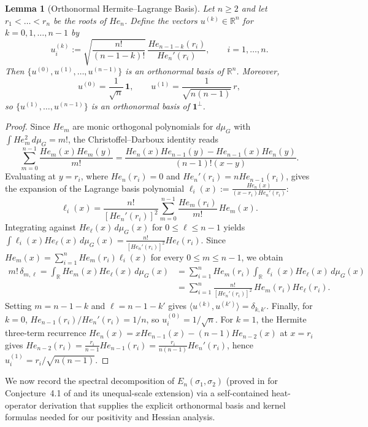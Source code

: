 \documentclass[11pt,a4paper]{article}
\newtheorem{lemma}[theorem]{Lemma}
\theoremstyle{definition}
\newcommand{\R}{\mathbb{R}}
\newcommand{\one}{\mathbf{1}}
\begin{document}
\begin{lemma}[Orthonormal Hermite--Lagrange Basis]
\label{lem:orthonormal}
Let $n \ge 2$ and let $r_1 < \dots < r_n$ be the roots of $He_n$. Define the vectors $u^{(k)} \in \R^n$ for $k = 0,1,\dots,n-1$ by
\begin{equation}
\label{eq:uk-def}
u^{(k)}_i := \sqrt{\frac{n!}{(n-1-k)!}}\,\frac{He_{n-1-k}(r_i)}{He_n'(r_i)}, \qquad i = 1,\dots,n.
\end{equation}
Then $\{u^{(0)}, u^{(1)}, \dots, u^{(n-1)}\}$ is an orthonormal basis of $\R^n$. Moreover,
\[
u^{(0)} = \frac{1}{\sqrt{n}}\,\one, \qquad u^{(1)} = \frac{1}{\sqrt{n(n-1)}}\,r,
\]
so $\{u^{(1)}, \dots, u^{(n-1)}\}$ is an orthonormal basis of $\one^\perp$.
\end{lemma}

\begin{proof}
Since $He_m$ are monic orthogonal polynomials for $d\mu_G$ with $\int He_m^2\,d\mu_G = m!$, the Christoffel--Darboux identity reads
\[
\sum_{m=0}^{n-1} \frac{He_m(x) He_m(y)}{m!} = \frac{He_n(x) He_{n-1}(y) - He_{n-1}(x) He_n(y)}{(n-1)!(x - y)}.
\]
Evaluating at $y = r_i$, where $He_n(r_i) = 0$ and $He_n'(r_i) = n He_{n-1}(r_i)$, gives the expansion of the Lagrange basis polynomial $\ell_i(x) := \frac{He_n(x)}{(x - r_i) He_n'(r_i)}$:
\[
\ell_i(x) = \frac{n!}{[He_n'(r_i)]^2} \sum_{m=0}^{n-1} \frac{He_m(r_i)}{m!}\, He_m(x).
\]
Integrating against $He_\ell(x)\,d\mu_G(x)$ for $0 \le \ell \le n-1$ yields $\int \ell_i(x) He_\ell(x)\,d\mu_G(x) = \frac{n!}{[He_n'(r_i)]^2} He_\ell(r_i)$. Since $He_m(x) = \sum_{i=1}^n He_m(r_i)\ell_i(x)$ for every $0 \le m \le n-1$, we obtain
\begin{align*}
m!\,\delta_{m,\ell} = \int_{\R} He_m(x) He_\ell(x)\,d\mu_G(x)
&= \sum_{i=1}^n He_m(r_i) \int_{\R} \ell_i(x) He_\ell(x)\,d\mu_G(x) \\
&= \sum_{i=1}^n \frac{n!}{[He_n'(r_i)]^2}\, He_m(r_i) He_\ell(r_i).
\end{align*}
Setting $m = n-1-k$ and $\ell = n-1-k'$ gives $\langle u^{(k)}, u^{(k')} \rangle = \delta_{k,k'}$. Finally, for $k=0$, $He_{n-1}(r_i)/He_n'(r_i) = 1/n$, so $u^{(0)}_i = 1/\sqrt{n}$. For $k=1$, the Hermite three-term recurrence $He_n(x) = x He_{n-1}(x) - (n-1) He_{n-2}(x)$ at $x = r_i$ gives $He_{n-2}(r_i) = \frac{r_i}{n-1} He_{n-1}(r_i) = \frac{r_i}{n(n-1)} He_n'(r_i)$, hence $u^{(1)}_i = r_i/\sqrt{n(n-1)}$.
\end{proof}

We now record the spectral decomposition of $E_n(\sigma_1,\sigma_2)$ (proved in \cite[Theorem~A.1]{HH2026} for Conjecture~4.1 of \cite{Hashemi2026} and its unequal-scale extension) via a self-contained heat-operator derivation that supplies the explicit orthonormal basis and kernel formulas needed for our positivity and Hessian analysis.
\end{document}
